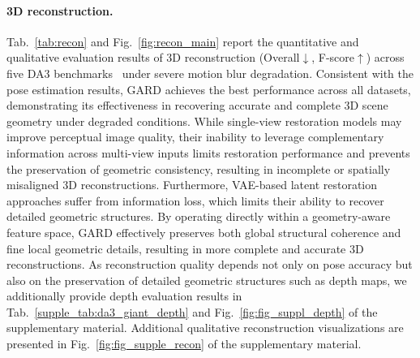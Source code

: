 \documentclass{llmxive}
\providecommand{\ourmodel}{GARD\xspace}
\begin{document}
\paragraph{3D reconstruction.}
Tab.~\ref{tab:recon} and Fig.~\ref{fig:recon_main} report the quantitative and qualitative evaluation results of 3D reconstruction (Overall$\downarrow$, F-score$\uparrow$) across five DA3 benchmarks~\cite{depthanything3} under severe motion blur degradation. Consistent with the pose estimation results, \ourmodel{} achieves the best performance across all datasets, demonstrating its effectiveness in recovering accurate and complete 3D scene geometry under degraded conditions. While single-view restoration models may improve perceptual image quality, their inability to leverage complementary information across multi-view inputs limits restoration performance and prevents the preservation of geometric consistency, resulting in incomplete or spatially misaligned 3D reconstructions. Furthermore, VAE-based latent restoration approaches suffer from information loss, which limits their ability to recover detailed geometric structures. By operating directly within a geometry-aware feature space, GARD effectively preserves both global structural coherence and fine local geometric details, resulting in more complete and accurate 3D reconstructions. As reconstruction quality depends not only on pose accuracy but also on the preservation of detailed geometric structures such as depth maps, we additionally provide depth evaluation results in Tab.~\ref{supple_tab:da3_giant_depth} and Fig.~\ref{fig:fig_suppl_depth} of the supplementary material. Additional qualitative reconstruction visualizations are presented in Fig.~\ref{fig:fig_supple_recon} of the supplementary material.
\end{document}
